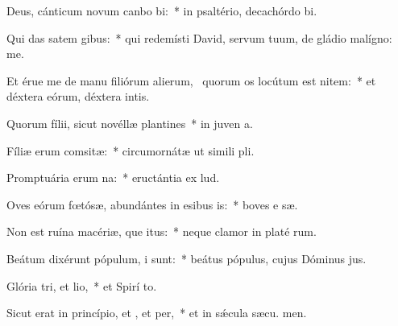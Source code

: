 \item Deus, cánticum novum canbo bi:~* in psaltério, decachórdo  bi.
\item Qui das satem gibus:~* qui redemísti David, servum tuum, de gládio malígno:  me.
\item Et érue me de manu filiórum alierum,~\pscross{} quorum os locútum est nitem:~* et déxtera eórum, déxtera intis.
\item Quorum fílii, sicut novéllæ plantines~* in juven a.
\item Fíliæ erum comsitæ:~* circumornátæ ut simili pli.
\item Promptuária erum na:~* eructántia ex   lud.
\item Oves eórum fœtósæ, abundántes in esibus is:~* boves e sæ.
\item Non est ruína macériæ, que itus:~* neque clamor in platé rum.
\item Beátum dixérunt pópulum, i  sunt:~* beátus pópulus, cujus Dóminus  jus.
\item Glória tri, et lio,~* et Spirí to.
\item Sicut erat in princípio, et , et per,~* et in sǽcula sæcu. men.
